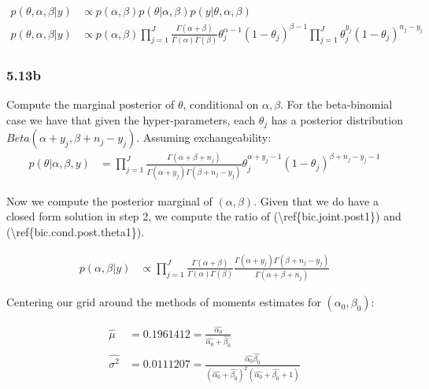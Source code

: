 \documentclass[]{article}
\begin{document}
\[
\begin{aligned}
p(\theta,\alpha,\beta|y) &\propto p(\alpha, \beta)p(\theta|\alpha, \beta)p(y|\theta,\alpha, \beta) \nonumber \\ 
p(\theta,\alpha,\beta|y) &\propto p(\alpha, \beta)\prod^{J}_{j=1} \frac{\Gamma(\alpha + \beta)}{\Gamma(\alpha)\Gamma(\beta)} \theta_{j}^{\alpha - 1} (1 - \theta_{j})^{\beta - 1}\prod^{J}_{j=1} \theta_{j}^{y_{j}} (1 - \theta_{j})^{n_{j}-y_{j}}\label{bic.joint.post1}
\end{aligned}
\]

\subsubsection{5.13b}\label{b-3}

Compute the marginal posterior of \(\theta\), conditional on
\(\alpha, \beta\). For the beta-binomial case we have that given the
hyper-parameters, each \(\theta_{j}\) has a posterior distribution
\(Beta(\alpha + y_{j}, \beta +n_{j} - y_{j})\). Assuming
exchangeability: \[
\begin{aligned}
p(\theta|\alpha,\beta,y) &= \prod^{J}_{j=1} \frac{\Gamma(\alpha + \beta +n_{j})}{\Gamma(\alpha+y_{j})\Gamma(\beta+n_{j}-y_{j})} \theta_{j}^{\alpha+y_{j} - 1} (1 - \theta_{j})^{\beta+n_{j}-y_{j} - 1}\label{bic.cond.post.theta1}
\end{aligned}
\]

Now we compute the posterior marginal of \((\alpha,\beta)\). Given that
we do have a closed form solution in step 2, we compute the ratio of
(\textbackslash{}ref\{bic.joint.post1\}) and
(\textbackslash{}ref\{bic.cond.post.theta1\}).

\[
\begin{aligned}
p(\alpha,\beta|y) &\propto \prod^{J}_{j=1} \frac{\Gamma(\alpha + \beta)}{\Gamma(\alpha)\Gamma(\beta)} \frac{\Gamma(\alpha+y_{j})\Gamma(\beta+n_{j}-y_{j})}{\Gamma(\alpha + \beta +n_{j})} \label{rat.marg.post.phi1}
\end{aligned}
\]

Centering our grid around the methods of moments estimates for
\((\alpha_{0}, \beta_{0})\):

\[
\begin{aligned}
\hat{\mu}     &= 0.1961412 = \frac{\hat{\alpha_{0}}}{\hat{\alpha_{0}}+\hat{\beta_{0}}}\\
\hat{\sigma^2} &= 0.0111207   = \frac{\hat{\alpha_{0}}\hat{\beta_{0}}}{(\hat{\alpha_{0}}+\hat{\beta_{0}})^{2}(\hat{\alpha_{0}}+\hat{\beta_{0}}+1)}
\end{aligned}
\]
\end{document}
